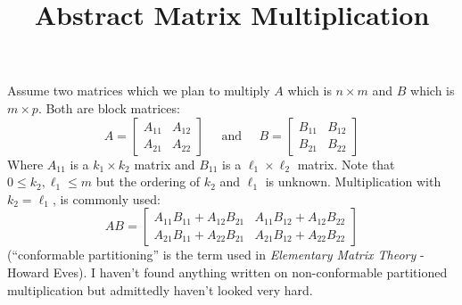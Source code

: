 \documentclass{letter}
\title{Abstract Matrix Multiplication}
\begin{document}
Assume two matrices which we plan to multiply $A$ which is $n \times m$ and $B$ which is $m \times p$.
Both are block matrices:
\begin{equation}
	A = \left[ \begin{array}{cc} A_{11} & A_{12} \\ A_{21} & A_{22} \end{array} \right]
	\;\;\;\;\; \text{and} \;\;\;\;\;
	B = \left[ \begin{array}{cc} B_{11} & B_{12} \\ B_{21} & B_{22} \end{array} \right]
\end{equation}
Where $A_{11}$ is a $k_1 \times k_2$ matrix and $B_{11}$ is a $\ell_1 \times \ell_2$ matrix.
Note that $0 \leq k_2 , \ell_1 \leq m$ but the ordering of $k_2$ and $\ell_1$ is unknown.
Multiplication with $k_2 = \ell_1$,  is commonly used:
\begin{equation}
	AB = \left[ \begin{array}{cc} 
		A_{11}B_{11}+A_{12}B_{21} & A_{11}B_{12}+A_{12}B_{22} \\ 
		A_{21}B_{11}+A_{22}B_{21} & A_{21}B_{12}+A_{22}B_{22}
	\end{array} \right]
\end{equation}
(``conformable partitioning'' is the term used in \emph{Elementary Matrix Theory} - Howard Eves).
I haven't found anything written on non-conformable partitioned multiplication but admittedly haven't looked very hard.
\end{document}
